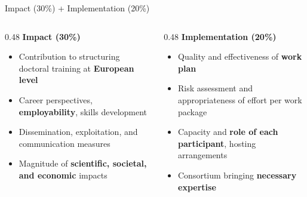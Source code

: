 \documentclass[aspectratio=169]{beamer}
\begin{document}
\begin{frame}{Impact (30\%) + Implementation (20\%)}
\begin{columns}[T]
\begin{column}{0.48\textwidth}
\textbf{\textcolor{euBlue}{Impact (30\%)}}
\begin{itemize}
  \item Contribution to structuring doctoral training at \textbf{European level}
  \item Career perspectives, \textbf{employability}, skills development
  \item Dissemination, exploitation, and communication measures
  \item Magnitude of \textbf{scientific, societal, and economic} impacts
\end{itemize}
\end{column}
\begin{column}{0.48\textwidth}
\textbf{\textcolor{euBlue}{Implementation (20\%)}}
\begin{itemize}
  \item Quality and effectiveness of \textbf{work plan}
  \item Risk assessment and appropriateness of effort per work package
  \item Capacity and \textbf{role of each participant}, hosting arrangements
  \item Consortium bringing \textbf{necessary expertise}
\end{itemize}
\end{column}
\end{columns}
\end{frame}
\end{document}
